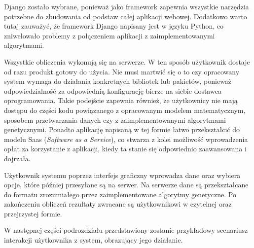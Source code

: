 \documentclass[twoside]{iisthesis}
\begin{document}
Django zostało wybrane, ponieważ jako framework zapewnia wszystkie narzędzia potrzebne do zbudowania od podstaw całej aplikacji webowej. Dodatkowo warto tutaj zauważyć, że framework Django napisany jest w języku Python, co zniwelowało problemy z połączeniem aplikacji z zaimplementowanymi algorytmami.

Wszystkie obliczenia wykonują się na serwerze. W ten sposób użytkownik dostaje od razu produkt gotowy do użycia. Nie musi martwić się o to czy opracowany system wymaga do działania konkretnych bibliotek lub pakietów, ponieważ odpowiedzialność za odpowiednią konfigurację bierze na siebie dostawca oprogramowania. Takie podejście zapewnia również, że użytkownicy nie mają dostępu do części kodu powiązanego z opracowanym modelem matematycznym, sposobem przetwarzania danych czy z zaimplementowanymi algorytmami genetycznymi. Ponadto aplikację napisaną w tej formie łatwo przekształcić do modelu Saas (\textit{Software as a Service}), co stwarza z kolei możliwość wprowadzenia opłat za korzystanie z aplikacji, kiedy ta stanie się odpowiednio zaawansowana i dojrzała.

Użytkownik systemu poprzez interfejs graficzny wprowadza dane oraz wybiera opcje, które później przesyłane są na serwer. Na serwerze dane są przekształcane do formatu zrozumiałego przez zaimplementowane algorytmy genetyczne. Po zakończeniu obliczeń rezultaty zwracane są użytkownikowi w czytelnej oraz przejrzystej formie.

W następnej części podrozdziału przedstawiony zostanie przykładowy scenariusz interakcji użytkownika z system, obrazujący jego działanie.
\end{document}
